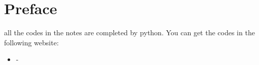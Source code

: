 \chapter*{Preface}




all the codes in the notes are completed by python. You can get the codes in the following website:
\begin{itemize}
    \item -
\end{itemize}


